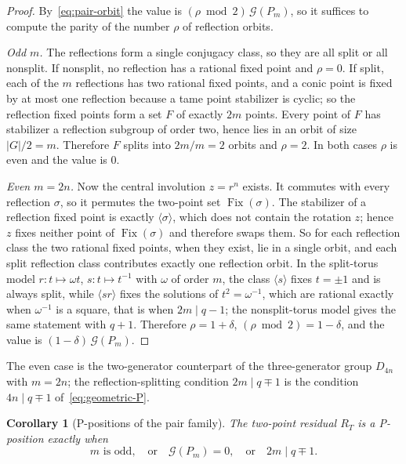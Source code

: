 \documentclass[11pt]{article}
\newtheorem{corollary}[theorem]{Corollary}
\theoremstyle{definition}
\theoremstyle{remark}
\newcommand{\Grundy}{\mathcal{G}}
\DeclareMathOperator{\Fix}{Fix}
\begin{document}
\begin{proof}
By~\eqref{eq:pair-orbit} the value is $(\rho\bmod2)\,\Grundy(P_m)$, so it suffices to compute the
parity of the number $\rho$ of reflection orbits.

\emph{Odd $m$.} The reflections form a single conjugacy class, so they are all split or all
nonsplit. If nonsplit, no reflection has a rational fixed point and $\rho=0$. If split, each of the
$m$ reflections has two rational fixed points, and a conic point is fixed by at most one reflection
because a tame point stabilizer is cyclic; so the reflection fixed points form a set $F$ of exactly
$2m$ points. Every point of $F$ has stabilizer a reflection subgroup of order two, hence lies in an
orbit of size $|G|/2=m$. Therefore $F$ splits into $2m/m=2$ orbits and $\rho=2$. In both cases
$\rho$ is even and the value is $0$.

\emph{Even $m=2n$.} Now the central involution $z=r^n$ exists. It commutes with every reflection
$\sigma$, so it permutes the two-point set $\Fix(\sigma)$. The stabilizer of a reflection fixed point
is exactly $\langle\sigma\rangle$, which does not contain the rotation $z$; hence $z$ fixes neither
point of $\Fix(\sigma)$ and therefore swaps them. So for each reflection class the two rational fixed
points, when they exist, lie in a single orbit, and each split reflection class contributes exactly
one reflection orbit. In the split-torus model $r:t\mapsto\omega t$, $s:t\mapsto t^{-1}$ with
$\omega$ of order $m$, the class $\langle s\rangle$ fixes $t=\pm1$ and is always split, while
$\langle sr\rangle$ fixes the solutions of $t^2=\omega^{-1}$, which are rational exactly when
$\omega^{-1}$ is a square, that is when $2m\mid q-1$; the nonsplit-torus model gives the same
statement with $q+1$. Therefore $\rho=1+\delta$, $(\rho\bmod2)=1-\delta$, and the value is
$(1-\delta)\,\Grundy(P_m)$.
\end{proof}

The even case is the two-generator counterpart of the three-generator group $D_{4n}$ with $m=2n$;
the reflection-splitting condition $2m\mid q\mp1$ is the condition $4n\mid q\mp1$
of~\eqref{eq:geometric-P}.

\begin{corollary}[P-positions of the pair family]
\label{cor:pair-P}
The two-point residual $R_T$ is a P-position exactly when
\begin{equation}
  m\text{ is odd},\quad\text{or}\quad \Grundy(P_m)=0,\quad\text{or}\quad 2m\mid q\mp1 .
  \label{eq:pair-P}
\end{equation}
\end{corollary}
\end{document}

